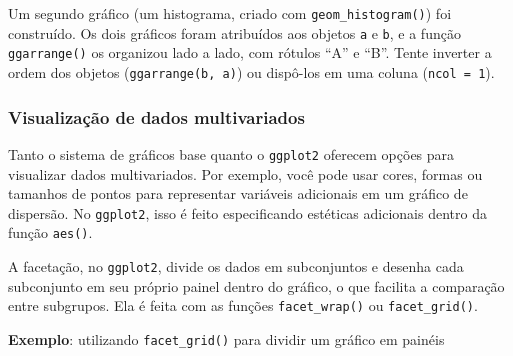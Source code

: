 \documentclass[
]{book}
\begin{document}
Um segundo gráfico (um histograma, criado com \texttt{geom\_histogram()}) foi construído. Os dois gráficos foram atribuídos aos objetos \texttt{a} e \texttt{b}, e a função \texttt{ggarrange()} os organizou lado a lado, com rótulos ``A'' e ``B''. Tente inverter a ordem dos objetos (\texttt{ggarrange(b,\ a)}) ou dispô-los em uma coluna (\texttt{ncol\ =\ 1}).

\subsubsection{Visualização de dados multivariados}\label{visualizauxe7uxe3o-de-dados-multivariados}

Tanto o sistema de gráficos base quanto o \texttt{ggplot2} oferecem opções para visualizar dados multivariados. Por exemplo, você pode usar cores, formas ou tamanhos de pontos para representar variáveis adicionais em um gráfico de dispersão. No \texttt{ggplot2}, isso é feito especificando estéticas adicionais dentro da função \texttt{aes()}.

A facetação, no \texttt{ggplot2}, divide os dados em subconjuntos e desenha cada subconjunto em seu próprio painel dentro do gráfico, o que facilita a comparação entre subgrupos. Ela é feita com as funções \texttt{facet\_wrap()} ou \texttt{facet\_grid()}.

\textbf{Exemplo}: utilizando \texttt{facet\_grid()} para dividir um gráfico em painéis
\end{document}
